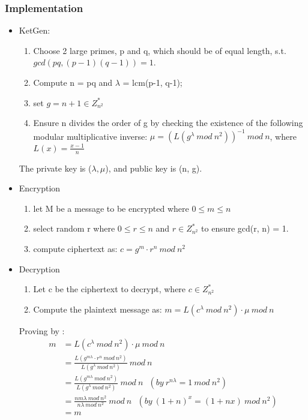 \documentclass[a4paper,11pt]{article}
\begin{document}
\subsubsection {Implementation}

\begin{itemize}
\item KetGen: 
\begin{enumerate}
\item Choose 2 large primes, p and q, which should be of equal length, s.t. $gcd(pq, (p-1)(q-1)) = 1$.
\item Compute n = pq and $\lambda$ = lcm(p-1, q-1);
\item set $g = n+1 \in Z_{n^2}^{*}$
\item Ensure n divides the order of g by checking the existence of the following modular multiplicative inverse:  $\mu  = (L(g^{\lambda}\ mod\ n^2))^{-1}\ mod\ n$, where $L(x) = \frac{x-1}{n}$
\end{enumerate}

The private key is ($\lambda,\mu$), and public key is (n, g).

\item Encryption
\begin{enumerate}
\item let M be a message to be encrypted where $0 \leq m \leq n$
\item select random r where $0 \le r \le n$ and $r \in Z_{n^2}^{*}$ to ensure gcd(r, n) = 1.
\item compute ciphertext as: $c = g^m \cdot r^n\ mod\  n^2$
\end{enumerate}

\item Decryption
\begin{enumerate}
\item Let c be the ciphertext to decrypt, where $c \in Z_{n^2}^{*}$
\item Compute the plaintext message as: $m = L(c^{\lambda}\ mod\ n^2)\cdot \mu\ mod\ n$
\end{enumerate}

Proving by :
\begin{equation}
\begin{split}
m &= L(c^{\lambda}\ mod\ n^2)\cdot \mu\ mod\ n    \\
  &= \frac{L(g^{m\lambda} \cdot r^n\ mod\ n^2) } {L(g^{\lambda}\ mod\ n^2)}\ mod\ n      \\
  &=  \frac{L(g^{m\lambda}\ mod\ n^2)} {L(g^{\lambda}\ mod\ n^2)}\ mod\ n \  \ \ (by\ r^{n\lambda} = 1\ mod\ n^2) \\
  &= \frac{nm\lambda\ mod\ n^2} {n\lambda\ mod\ n^2}\ mod\ n   \ \ \ (by\ (1+n)^x = (1 + nx)\ mod\ n^2) \\
  &= m 
\end{split}
\end{equation}


\end{itemize}
\end{document}

